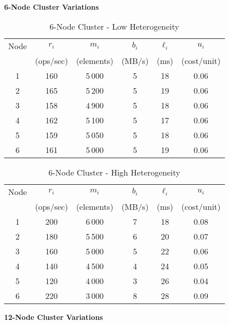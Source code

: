 \documentclass[]{interact}
\theoremstyle{plain}
\theoremstyle{definition}
\theoremstyle{remark}
\begin{document}
\medskip
\textbf{6-Node Cluster Variations}

\begin{table}[H]
  \centering
  \caption{6-Node Cluster - Low Heterogeneity}
  \label{tab:env6low}
  \begin{tabular}{c|ccccc}
    \toprule
    Node & $r_i$ & $m_i$ & $b_i$ & $\ell_i$ & $u_i$ \\
         & (ops/sec) & (elements) & (MB/s) & (ms) & (cost/unit) \\
    \midrule
    1 & 160 & 5\,000 & 5 & 18 & 0.06 \\
    2 & 165 & 5\,200 & 5 & 19 & 0.06 \\
    3 & 158 & 4\,900 & 5 & 18 & 0.06 \\
    4 & 162 & 5\,100 & 5 & 17 & 0.06 \\
    5 & 159 & 5\,050 & 5 & 18 & 0.06 \\
    6 & 161 & 5\,000 & 5 & 19 & 0.06 \\
    \bottomrule
  \end{tabular}
\end{table}

\begin{table}[H]
  \centering
  \caption{6-Node Cluster - High Heterogeneity}
  \label{tab:env6high}
  \begin{tabular}{c|ccccc}
    \toprule
    Node & $r_i$ & $m_i$ & $b_i$ & $\ell_i$ & $u_i$ \\
         & (ops/sec) & (elements) & (MB/s) & (ms) & (cost/unit) \\
    \midrule
    1 & 200 & 6\,000 & 7 & 18 & 0.08 \\
    2 & 180 & 5\,500 & 6 & 20 & 0.07 \\
    3 & 160 & 5\,000 & 5 & 22 & 0.06 \\
    4 & 140 & 4\,500 & 4 & 24 & 0.05 \\
    5 & 120 & 4\,000 & 3 & 26 & 0.04 \\
    6 & 220 & 3\,000 & 8 & 28 & 0.09 \\
    \bottomrule
  \end{tabular}
\end{table}

\medskip
\textbf{12-Node Cluster Variations}
\end{document}
